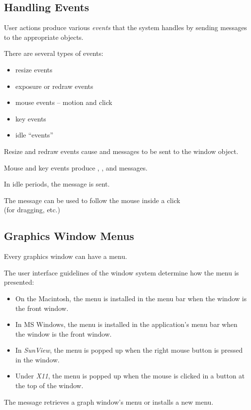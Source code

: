 \begin{slide}{}
\subsection{Handling Events}
User actions produce various {\em events}\/ that the system handles
by sending messages to the appropriate objects.

There are several types of events:
\begin{itemize}
\item resize events
\item exposure or redraw events
\item mouse events -- motion and click
\item key events
\item idle ``events''
\end{itemize}
Resize and redraw events cause  and 
messages to be sent to the window object.

Mouse and key events produce , ,
and  messages.

In idle periods, the  message is sent.

The  message can be used to follow the mouse
inside a click\\
(for dragging, etc.)
\end{slide}

\begin{slide}{}
\subsection{Graphics Window Menus}
Every graphics window can have a menu.

The user interface guidelines of the window system determine how
the menu is presented:
\begin{itemize}
\item
On the Macintosh, the menu is installed in the menu bar when the window
is the front window.
\item
In MS Windows, the menu is installed in the application's menu bar when
the window is the front window.
\item
In {\em SunView}, the menu is popped up when the right mouse button is
pressed in the window.
\item
Under {\em X11}, the menu is popped up when the mouse is clicked in a
 button at the top of the window.
\end{itemize}
The  message retrieves a graph window's menu
or installs a new menu.
\end{slide}

